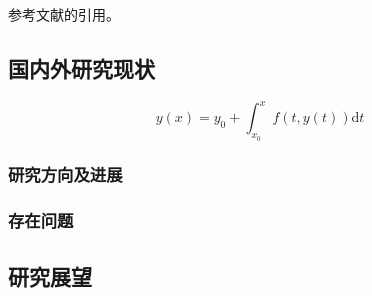 参考文献的引用。

\subsection{国内外研究现状}
\begin{equation}
    y(x)=y_0+\int_{x_0}^xf(t,y(t))\text{d}t
\end{equation}
\subsubsection{研究方向及进展}
	
\subsubsection{存在问题}
	
\subsection{研究展望}